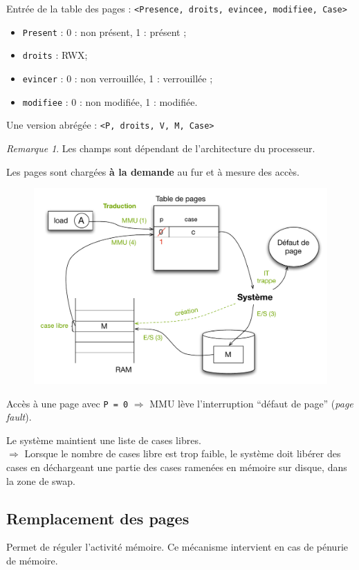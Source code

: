\documentclass[11pt,english,french]{scrreprt}
\theoremstyle{remark}
\newtheorem*{rem*}{Remarque}
\theoremstyle{definition}
\begin{document}
Entrée de la table des pages : 
\lstinline!<Presence, droits, evincee, modifiee, Case>!
\begin{itemize}
	\item \lstinline!Present! : 0 : non présent, 1 : présent ;
	\item \lstinline!droits! : RWX;
	\item \lstinline!evincer! : 0 : non verrouillée, 1 : verrouillée ;
	\item \lstinline!modifiee! : 0 : non modifiée, 1 : modifiée.
\end{itemize}
Une version abrégée : \lstinline!<P, droits, V, M, Case>!

\begin{rem*}
    Les champs sont dépendant de l'architecture du processeur. 
\end{rem*}

Les pages sont chargées \textbf{à la demande} au fur et à mesure des accès.
\begin{figure}[h!]
	\center
	\vspace{-10pt}
	\includegraphics[scale=.5]{img/pages-load}
\end{figure}
Accès à une page avec \lstinline!P = 0! $\Rightarrow$ MMU lève l'interruption ``défaut de page'' (\emph{page fault}).

Le système maintient une liste de cases libres.\\
 $\Rightarrow$ Lorsque le nombre de cases libre est trop faible, le système doit libérer des cases en déchargeant une partie des cases ramenées en mémoire sur disque, dans la zone de swap.

\subsection{Remplacement des pages}
Permet de réguler l'activité mémoire. Ce mécanisme intervient en cas de pénurie de mémoire.
\end{document}
